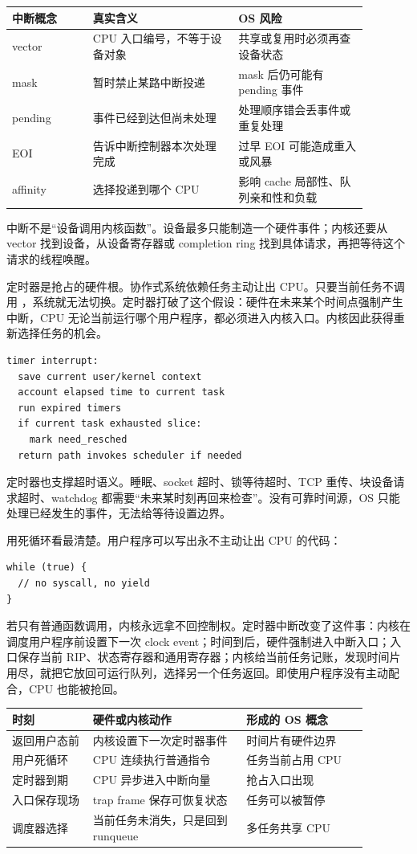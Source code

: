 \begin{longtable}{p{0.2\linewidth}p{0.36\linewidth}p{0.32\linewidth}}
\toprule
中断概念 & 真实含义 & OS 风险 \\
\midrule
vector & CPU 入口编号，不等于设备对象 & 共享或复用时必须再查设备状态 \\
mask & 暂时禁止某路中断投递 & mask 后仍可能有 pending 事件 \\
pending & 事件已经到达但尚未处理 & 处理顺序错会丢事件或重复处理 \\
EOI & 告诉中断控制器本次处理完成 & 过早 EOI 可能造成重入或风暴 \\
affinity & 选择投递到哪个 CPU & 影响 cache 局部性、队列亲和性和负载 \\
\bottomrule
\end{longtable}

中断不是“设备调用内核函数”。设备最多只能制造一个硬件事件；内核还要从 vector 找到设备，从设备寄存器或 completion ring 找到具体请求，再把等待这个请求的线程唤醒。

定时器是抢占的硬件根。协作式系统依赖任务主动让出 CPU。只要当前任务不调用 ，系统就无法切换。定时器打破了这个假设：硬件在未来某个时间点强制产生中断，CPU 无论当前运行哪个用户程序，都必须进入内核入口。内核因此获得重新选择任务的机会。

\begin{lstlisting}
timer interrupt:
  save current user/kernel context
  account elapsed time to current task
  run expired timers
  if current task exhausted slice:
    mark need_resched
  return path invokes scheduler if needed
\end{lstlisting}

定时器也支撑超时语义。睡眠、socket 超时、锁等待超时、TCP 重传、块设备请求超时、watchdog 都需要“未来某时刻再回来检查”。没有可靠时间源，OS 只能处理已经发生的事件，无法给等待设置边界。

用死循环看最清楚。用户程序可以写出永不主动让出 CPU 的代码：

\begin{lstlisting}
while (true) {
  // no syscall, no yield
}
\end{lstlisting}

若只有普通函数调用，内核永远拿不回控制权。定时器中断改变了这件事：内核在调度用户程序前设置下一次 clock event；时间到后，硬件强制进入中断入口；入口保存当前 RIP、状态寄存器和通用寄存器；内核给当前任务记账，发现时间片用尽，就把它放回可运行队列，选择另一个任务返回。即使用户程序没有主动配合，CPU 也能被抢回。

\begin{longtable}{p{0.2\linewidth}p{0.38\linewidth}p{0.3\linewidth}}
\toprule
时刻 & 硬件或内核动作 & 形成的 OS 概念 \\
\midrule
返回用户态前 & 内核设置下一次定时器事件 & 时间片有硬件边界 \\
用户死循环 & CPU 连续执行普通指令 & 任务当前占用 CPU \\
定时器到期 & CPU 异步进入中断向量 & 抢占入口出现 \\
入口保存现场 & trap frame 保存可恢复状态 & 任务可以被暂停 \\
调度器选择 & 当前任务未消失，只是回到 runqueue & 多任务共享 CPU \\
\bottomrule
\end{longtable}

